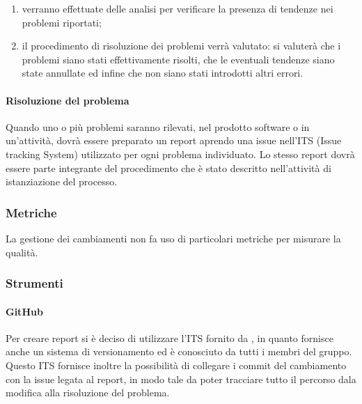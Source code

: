 \begin{enumerate}
				\item verranno effettuate delle analisi per verificare la presenza di tendenze nei problemi riportati;

				\item il procedimento di risoluzione dei problemi verrà valutato: si valuterà che i problemi siano stati effettivamente risolti, che le eventuali tendenze siano state annullate ed infine che non siano stati introdotti altri errori.
			\end{enumerate}
		\paragraph{Risoluzione del problema}
			Quando uno o più problemi saranno rilevati, nel prodotto software o in un'attività, dovrà essere preparato un report aprendo una issue nell'ITS (Issue tracking System) utilizzato per ogni problema individuato. Lo stesso report dovrà essere parte integrante del procedimento che è stato descritto nell'attività di istanziazione del processo.
	\subsubsection{Metriche}
		La gestione dei cambiamenti non fa uso di particolari metriche per misurare la qualità.
	\subsubsection{Strumenti}
		\paragraph{GitHub}
			Per creare report si è deciso di utilizzare l'ITS fornito da , in quanto fornisce anche un sistema di versionamento ed è conosciuto da tutti i membri del gruppo.
			Questo ITS fornisce inoltre la possibilità di collegare i commit del cambiamento con la issue legata al report, in modo tale da poter tracciare tutto il percorso dala modifica alla risoluzione del problema.
